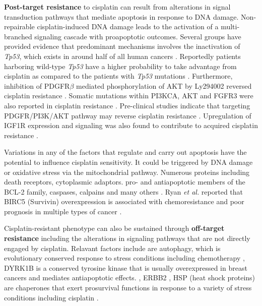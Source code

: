 
\textbf{Post-target resistance} to cisplatin can result from alterations in signal transduction pathways that mediate apoptosis in response to DNA damage. Non-repairable cisplatin-induced DNA damage leads to the activation of a multi-branched signaling cascade with proapoptotic outcomes. Several groups have provided evidence that predominant mechanisms involves the inactivation of \textit{Tp53}, which exists in around half of all human cancers \cite{kirsch1998tumor}. Reportedly patients harboring wild-type \textit{Tp53} have a higher probability to take advantage from cisplatin as compared to the patients with \textit{Tp53} mutations \cite{vousden2007p53,gadducci2002molecular}. 
Furthermore, inhibition of PDGFR$\beta$ mediated phosphorylation of AKT by Ly294002 reversed cisplatin resistance \cite{juliachs2014pdgfrbeta}. Somatic mutations within PI3KCA, AKT and FGFR3 were also reported in cisplatin resistance \cite{feldman2014presence}. Pre-clinical studies indicate that targeting PDGFR/PI3K/AKT pathway may reverse cisplatin resistance \cite{juliachs2013effectivity}.
Upregulation of IGF1R expression and signaling was also found to contribute to acquired cisplatin resistance \cite{selfe2018igf1r}. 

Variations in any of the factors that regulate and carry out apoptosis have the potential to influence cisplatin sensitivity. It could be triggered by DNA damage or oxidative stress via the mitochondrial pathway. Numerous proteins including death receptors, cytoplasmic adaptors. pro- and antiapoptotic members of the BCL-2 family, caspases, calpains and many others \cite{jain2011molecular, janson2010resistance, michaud2009bcl}. Ryan \textit{et al.} reported that BIRC5 (Survivin) overexpression is associated with chemoresistance and poor prognosis in multiple types of cancer \cite{ryan2009survivin}. 

Cisplatin-resistant phenotype can also be sustained through \textbf{off-target resistance} including the alterations in signaling pathways that are not directly engaged by cisplatin. Relavant factors include are autophagy, which is evolutionary conserved response to stress conditions including chemotherapy \cite{tan2019trp14}, DYRK1B is a conserved tyrosine kinase that is usually overexpressed in breast cancers and mediates antiapoptotic effects.  \cite{hu2010depleting}, ERBB2 \cite{fijolek2006p53}, HSP (heat shock proteins)  are chaperones that exert prosurvival functions in response to a variety of stress conditions including cisplatin \cite{ren2008down}. 

